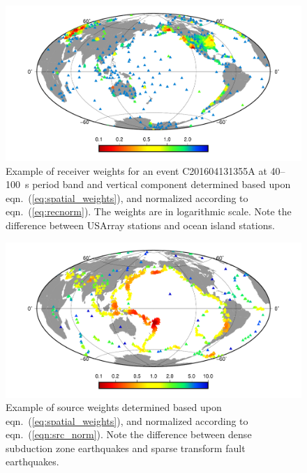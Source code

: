 \begin{figure}
 \centering 
   	\begin{minipage}[t]{.9\columnwidth}
  	\centering 
 	\includegraphics[width=.95\textwidth]{ch-weighting/figures/receiver-weights-40-100-Z.pdf}
	\end{minipage}
\caption{\small{Example of receiver weights for an event C201604131355A at 40--100~s period band and vertical component determined based upon eqn.~(\ref{eq:spatial_weights}),
and normalized according to eqn.~(\ref{eq:recnorm}). The weights are in logarithmic scale.
Note the difference between USArray stations 
and ocean island stations. 
}}
\label{fig:receiver_weights}
\end{figure}

\begin{figure}
 \centering 
   	\begin{minipage}[t]{.9\columnwidth}
  	\centering 
	\includegraphics[width=.95\textwidth]{ch-weighting/figures/source-weights.pdf}
	\end{minipage}
\caption{\small{Example of source weights determined based upon eqn.~(\ref{eq:spatial_weights}),
and normalized according to eqn.~(\ref{eqn:src_norm}).
Note the difference between dense subduction zone
earthquakes and sparse transform fault earthquakes.  
}}
\label{fig:source_weights}
\end{figure}

